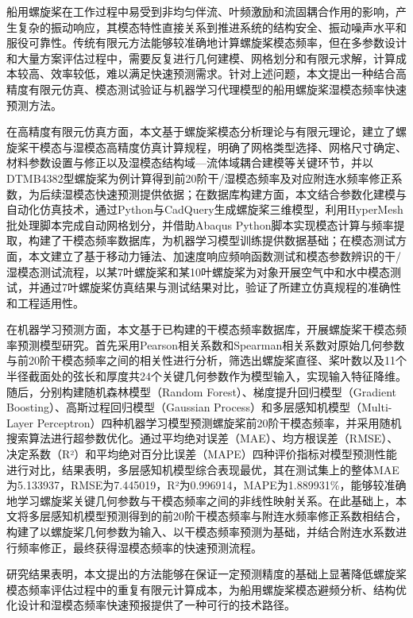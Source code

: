 
船用螺旋桨在工作过程中易受到非均匀伴流、叶频激励和流固耦合作用的影响，产生复杂的振动响应，其模态特性直接关系到推进系统的结构安全、振动噪声水平和服役可靠性。传统有限元方法能够较准确地计算螺旋桨模态频率，但在多参数设计和大量方案评估过程中，需要反复进行几何建模、网格划分和有限元求解，计算成本较高、效率较低，难以满足快速预测需求。针对上述问题，本文提出一种结合高精度有限元仿真、模态测试验证与机器学习代理模型的船用螺旋桨湿模态频率快速预测方法。

在高精度有限元仿真方面，本文基于螺旋桨模态分析理论与有限元理论，建立了螺旋桨干模态与湿模态高精度仿真计算规程，明确了网格类型选择、网格尺寸确定、材料参数设置与修正以及湿模态结构域—流体域耦合建模等关键环节，并以DTMB4382型螺旋桨为例计算得到前20阶干/湿模态频率及对应附连水频率修正系数，为后续湿模态快速预测提供依据；在数据库构建方面，本文结合参数化建模与自动化仿真技术，通过Python与CadQuery生成螺旋桨三维模型，利用HyperMesh批处理脚本完成自动网格划分，并借助Abaqus Python脚本实现模态计算与频率提取，构建了干模态频率数据库，为机器学习模型训练提供数据基础；在模态测试方面，本文建立了基于移动力锤法、加速度响应频响函数测试和模态参数辨识的干/湿模态测试流程，以某7叶螺旋桨和某10叶螺旋桨为对象开展空气中和水中模态测试，并通过7叶螺旋桨仿真结果与测试结果对比，验证了所建立仿真规程的准确性和工程适用性。

在机器学习预测方面，本文基于已构建的干模态频率数据库，开展螺旋桨干模态频率预测模型研究。首先采用Pearson相关系数和Spearman相关系数对原始几何参数与前20阶干模态频率之间的相关性进行分析，筛选出螺旋桨直径、桨叶数以及11个半径截面处的弦长和厚度共24个关键几何参数作为模型输入，实现输入特征降维。随后，分别构建随机森林模型（Random Forest）、梯度提升回归模型（Gradient Boosting）、高斯过程回归模型（Gaussian Process）和多层感知机模型（Multi-Layer Perceptron）四种机器学习模型预测螺旋桨前20阶干模态频率，并采用随机搜索算法进行超参数优化。通过平均绝对误差（MAE）、均方根误差（RMSE）、决定系数（R²）和平均绝对百分比误差（MAPE）四种评价指标对模型预测性能进行对比，结果表明，多层感知机模型综合表现最优，其在测试集上的整体MAE为5.133937，RMSE为7.445019，R²为0.996914，MAPE为1.889931\%，能够较准确地学习螺旋桨关键几何参数与干模态频率之间的非线性映射关系。在此基础上，本文将多层感知机模型预测得到的前20阶干模态频率与附连水频率修正系数相结合，构建了以螺旋桨几何参数为输入、以干模态频率预测为基础，并结合附连水系数进行频率修正，最终获得湿模态频率的快速预测流程。

研究结果表明，本文提出的方法能够在保证一定预测精度的基础上显著降低螺旋桨模态频率评估过程中的重复有限元计算成本，为船用螺旋桨模态避频分析、结构优化设计和湿模态频率快速预报提供了一种可行的技术路径。
